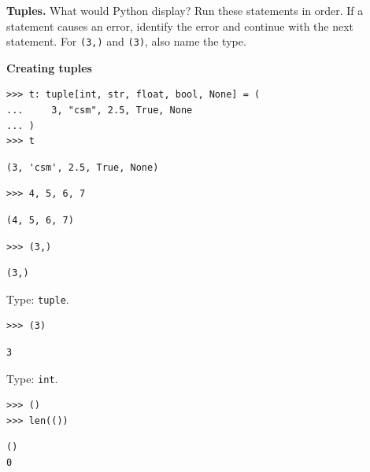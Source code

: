\begin{blocksection}
\question \textbf{Tuples.} What would Python display? Run these statements in order. If a statement
causes an error, identify the error and continue with the next statement.
For \lstinline{(3,)} and \lstinline{(3)}, also name the type.

\textbf{Creating tuples}
\begin{lstlisting}
>>> t: tuple[int, str, float, bool, None] = (
...     3, "csm", 2.5, True, None
... )
>>> t
\end{lstlisting}
\begin{solution}[.3in]
\begin{lstlisting}
(3, 'csm', 2.5, True, None)
\end{lstlisting}
\end{solution}
\end{blocksection}

\begin{blocksection}
\begin{lstlisting}
>>> 4, 5, 6, 7
\end{lstlisting}
\begin{solution}[.3in]
\begin{lstlisting}
(4, 5, 6, 7)
\end{lstlisting}
\end{solution}
\end{blocksection}

\begin{blocksection}
\begin{lstlisting}
>>> (3,)
\end{lstlisting}
\begin{solution}[.3in]
\begin{lstlisting}
(3,)
\end{lstlisting}
Type: \lstinline{tuple}.
\end{solution}
\end{blocksection}

\begin{blocksection}
\begin{lstlisting}
>>> (3)
\end{lstlisting}
\begin{solution}[.3in]
\begin{lstlisting}
3
\end{lstlisting}
Type: \lstinline{int}.
\end{solution}
\end{blocksection}

\begin{blocksection}
\begin{lstlisting}
>>> ()
>>> len(())
\end{lstlisting}
\begin{solution}[.45in]
\begin{lstlisting}
()
0
\end{lstlisting}
\end{solution}
\end{blocksection}

